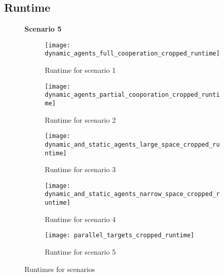 \subsection{Runtime}
\begin{figure}[H]
    \centering
    \textbf{Scenario 5}\par \medskip
    \begin{subfigure}{0.49\textwidth}
        \centering
        \texttt{[image: dynamic\_agents\_full\_cooperation\_cropped\_runtime]}
        \caption{Runtime for scenario 1}
    \end{subfigure}
    \begin{subfigure}{0.49\textwidth}
        \centering
        \texttt{[image: dynamic\_agents\_partial\_cooporation\_cropped\_runtime]}
        \caption{Runtime for scenario 2}
    \end{subfigure}
    \begin{subfigure}{0.49\textwidth}
        \centering
        \texttt{[image: dynamic\_and\_static\_agents\_large\_space\_cropped\_runtime]}
        \caption{Runtime for scenario 3}
    \end{subfigure}
    \begin{subfigure}{0.49\textwidth}
        \centering
        \texttt{[image: dynamic\_and\_static\_agents\_narrow\_space\_cropped\_runtime]}
        \caption{Runtime for scenario 4}
    \end{subfigure}
    \begin{subfigure}{0.49\textwidth}
        \centering
        \texttt{[image: parallel\_targets\_cropped\_runtime]}
        \caption{Runtime for scenario 5}
    \end{subfigure}
    \caption{Runtimes for scenarios}
    \label{fig:runtimes}
\end{figure}
